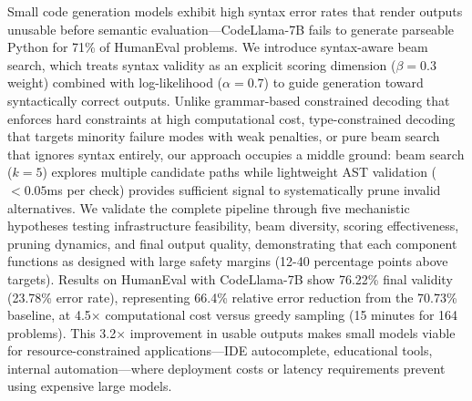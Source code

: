 Small code generation models exhibit high syntax error rates that render outputs unusable before semantic evaluation---CodeLlama-7B fails to generate parseable Python for 71\% of HumanEval problems. We introduce syntax-aware beam search, which treats syntax validity as an explicit scoring dimension ($\beta=0.3$ weight) combined with log-likelihood ($\alpha=0.7$) to guide generation toward syntactically correct outputs. Unlike grammar-based constrained decoding that enforces hard constraints at high computational cost, type-constrained decoding that targets minority failure modes with weak penalties, or pure beam search that ignores syntax entirely, our approach occupies a middle ground: beam search ($k=5$) explores multiple candidate paths while lightweight AST validation ($<0.05$ms per check) provides sufficient signal to systematically prune invalid alternatives. We validate the complete pipeline through five mechanistic hypotheses testing infrastructure feasibility, beam diversity, scoring effectiveness, pruning dynamics, and final output quality, demonstrating that each component functions as designed with large safety margins (12-40 percentage points above targets). Results on HumanEval with CodeLlama-7B show 76.22\% final validity (23.78\% error rate), representing 66.4\% relative error reduction from the 70.73\% baseline, at 4.5$\times$ computational cost versus greedy sampling (15 minutes for 164 problems). This 3.2$\times$ improvement in usable outputs makes small models viable for resource-constrained applications---IDE autocomplete, educational tools, internal automation---where deployment costs or latency requirements prevent using expensive large models.
